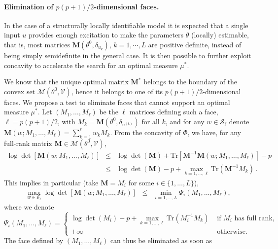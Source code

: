 \documentclass[twocolumn]{autart}
\newcommand{\Luc}{\color{magenta} }
\theoremstyle{definition}
\theoremstyle{remark}
\newcommand{\Tr}{\mathrm{Tr}}
\newcommand{\V}{\mathcal{V}}
\newcommand{\Mb}{\mathbf{M}}
\renewcommand{\S}{\mathcal{S}}
\begin{document}
\paragraph{Elimination of $p(p+1)/2$-dimensional faces.}
{\Luc In the case of a structurally locally identifiable model %
it is expected that a single input $u$ provides enough excitation to make the parameters $\theta$ (locally) estimable, that is, most matrices $\Mb(\theta^0,\delta_{u_k})$, $k=1,\cdots,L$ are positive definite, instead of being simply semidefinite in the general case. It is then possible to further exploit concavity to accelerate the search for an optimal measure $\mu^*$.

We know that the unique optimal matrix 
$\Mb^*$
belongs to the boundary of the convex set $\mathcal{M}(\theta^0,\V)$, hence it belongs to one of its  $p(p+1)/2$-dimensional faces. 
We propose a test to eliminate faces that cannot support an optimal measure $\mu^*$. Let $(M_1,\dots , M_\ell)$ be the $\ell$ matrices defining such a face, $\ell = p(p+1)/2$, with $M_k=\Mb(\theta^0,\delta_{u^{(k)}})$ for all $k$, and for 
any $w\in\S_\ell$ denote $\Mb(w;M_1,\dots , M_\ell)=\sum_{k=1}^\ell w_k M_k$.
From the concavity of $\Phi$, we have, for any full-rank matrix $\Mb\in\mathcal{M}(\theta^0,\V)$,
\begin{eqnarray*}
\log\det \left[\Mb(w;M_1,\dots, M_\ell)\right] &\leq& \log\det(\Mb) + \Tr\left[\Mb^{-1}\Mb(w;M_1,\dots, M_\ell)\right] - p \\
&\leq& \log\det(\Mb) -p  + \max_{k=1,\ldots,\ell} \Tr(\Mb^{-1}M_k) \,.
\end{eqnarray*}
This implies in particular (take $\Mb=M_i$ for some $i\in\{1,\ldots,L\}$),
\begin{eqnarray*}
\max_{w\in\S_\ell} \log\det \left[\Mb(w;M_1,\dots, M_\ell)\right] &\leq&  \min_{i=1,\ldots,L} \Psi_i(M_1,\dots , M_\ell),
\end{eqnarray*}
where we denote 
$$
\Psi_i(M_1,\dots , M_\ell) = \left\{\begin{array}{ll}
    \log\det(M_i) - p + \max_{k=1,\ldots,\ell} \Tr(M_i^{-1}M_k)  &  \mbox{ if }  M_i \mbox{ has full rank,}\\
    +\infty & \mbox{ otherwise.} 
\end{array}
\right.
$$
The face defined by $(M_1,\dots , M_\ell)$ can thus be eliminated as soon as 
}
\end{document}
